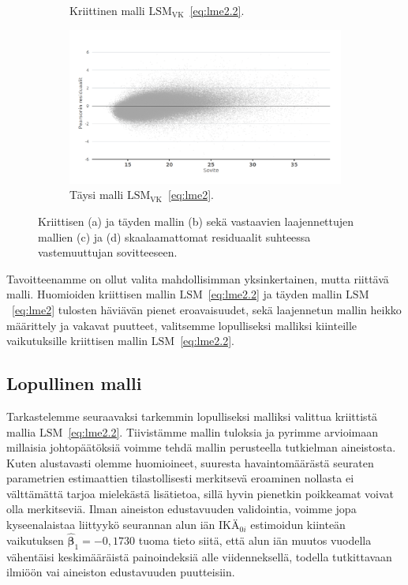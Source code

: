 \documentclass[finnish]{docopts}
\begin{document}
\begin{figure}[H]
\begin{subfigure}[b]{0.4\textwidth}
  \caption{Kriittinen malli $\text{LSM}_{\text{VK}}$~\ref{eq:lme2.2}.}
  \label{fig:lme_vk_krit_fitresid}
\end{subfigure}%
\begin{subfigure}[b]{0.4\textwidth}
\centering
  \includegraphics[width=.8\linewidth]{kuvaajat/lme3_full_vc_fitresid.png}
  \caption{Täysi malli $\text{LSM}_{\text{VK}}$~\ref{eq:lme2}.}
  \label{fig:lme_vk_taysi_fitresid}
\end{subfigure}
 \caption{Kriittisen (a) ja täyden mallin (b) sekä vastaavien laajennettujen mallien (c) ja (d) skaalaamattomat residuaalit suhteessa vastemuuttujan sovitteeseen.}
   \label{fig:lme_fitresid_qq}
\end{figure}

Tavoitteenamme on ollut valita mahdollisimman yksinkertainen, mutta riittävä malli. Huomioiden kriittisen mallin $\text{LSM}$~\ref{eq:lme2.2} ja täyden mallin $\text{LSM}$~\ref{eq:lme2} tulosten häviävän pienet eroavaisuudet, sekä laajennetun mallin heikko määrittely ja vakavat puutteet, valitsemme lopulliseksi malliksi kiinteille vaikutuksille kriittisen mallin $\text{LSM}$~\ref{eq:lme2.2}.\\

\subsection{Lopullinen malli}

Tarkastelemme seuraavaksi tarkemmin lopulliseksi malliksi valittua kriittistä mallia $\text{LSM}$~\ref{eq:lme2.2}. Tiivistämme mallin tuloksia ja pyrimme arvioimaan millaisia johtopäätöksiä voimme tehdä mallin perusteella tutkielman aineistosta.\\

Kuten alustavasti olemme huomioineet, suuresta havaintomäärästä seuraten parametrien estimaattien tilastollisesti merkitsevä eroaminen nollasta ei välttämättä tarjoa mielekästä lisätietoa, sillä hyvin pienetkin poikkeamat voivat olla merkitseviä. Ilman aineiston edustavuuden validointia, voimme jopa kyseenalaistaa liittyykö seurannan alun iän $\text{IKÄ}_{0i}$ estimoidun kiinteän vaikutuksen $\hat{\bm{\beta}}_1 = -0,1730$ tuoma tieto siitä, että alun iän muutos vuodella vähentäisi keskimääräistä painoindeksiä alle viidenneksellä, todella tutkittavaan ilmiöön vai aineiston edustavuuden puutteisiin.\\
\end{document}
